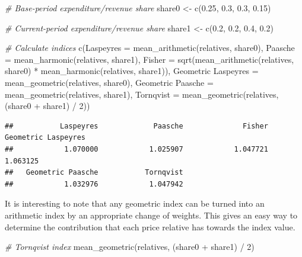 \documentclass[
]{article}
\newenvironment{Shaded}{\begin{snugshade}}{\end{snugshade}}
\newcommand{\AttributeTok}[1]{\textcolor[rgb]{0.77,0.63,0.00}{#1}}
\newcommand{\CommentTok}[1]{\textcolor[rgb]{0.56,0.35,0.01}{\textit{#1}}}
\newcommand{\DecValTok}[1]{\textcolor[rgb]{0.00,0.00,0.81}{#1}}
\newcommand{\FloatTok}[1]{\textcolor[rgb]{0.00,0.00,0.81}{#1}}
\newcommand{\FunctionTok}[1]{\textcolor[rgb]{0.00,0.00,0.00}{#1}}
\newcommand{\NormalTok}[1]{#1}
\newcommand{\OtherTok}[1]{\textcolor[rgb]{0.56,0.35,0.01}{#1}}
\newcommand{\SpecialCharTok}[1]{\textcolor[rgb]{0.00,0.00,0.00}{#1}}
\newcommand{\StringTok}[1]{\textcolor[rgb]{0.31,0.60,0.02}{#1}}
\begin{document}
\begin{Shaded}
\begin{Highlighting}[]
\CommentTok{\# Base{-}period expenditure/revenue share}
\NormalTok{share0 }\OtherTok{\textless{}{-}} \FunctionTok{c}\NormalTok{(}\FloatTok{0.25}\NormalTok{, }\FloatTok{0.3}\NormalTok{, }\FloatTok{0.3}\NormalTok{, }\FloatTok{0.15}\NormalTok{) }

\CommentTok{\# Current{-}period expenditure/revenue share}
\NormalTok{share1 }\OtherTok{\textless{}{-}} \FunctionTok{c}\NormalTok{(}\FloatTok{0.2}\NormalTok{, }\FloatTok{0.2}\NormalTok{, }\FloatTok{0.4}\NormalTok{, }\FloatTok{0.2}\NormalTok{)}

\CommentTok{\# Calculate indices}
\FunctionTok{c}\NormalTok{(}\AttributeTok{Laspeyres =} \FunctionTok{mean\_arithmetic}\NormalTok{(relatives, share0),}
  \AttributeTok{Paasche =} \FunctionTok{mean\_harmonic}\NormalTok{(relatives, share1),}
  \AttributeTok{Fisher =} \FunctionTok{sqrt}\NormalTok{(}\FunctionTok{mean\_arithmetic}\NormalTok{(relatives, share0) }\SpecialCharTok{*}
                  \FunctionTok{mean\_harmonic}\NormalTok{(relatives, share1)),}
  \StringTok{\textasciigrave{}}\AttributeTok{Geometric Laspeyres}\StringTok{\textasciigrave{}} \OtherTok{=} \FunctionTok{mean\_geometric}\NormalTok{(relatives, share0),}
  \StringTok{\textasciigrave{}}\AttributeTok{Geometric Paasche}\StringTok{\textasciigrave{}} \OtherTok{=} \FunctionTok{mean\_geometric}\NormalTok{(relatives, share1),}
  \AttributeTok{Tornqvist =} \FunctionTok{mean\_geometric}\NormalTok{(relatives, (share0 }\SpecialCharTok{+}\NormalTok{ share1) }\SpecialCharTok{/} \DecValTok{2}\NormalTok{))}
\end{Highlighting}
\end{Shaded}

\begin{verbatim}
##           Laspeyres             Paasche              Fisher Geometric Laspeyres 
##            1.070000            1.025907            1.047721            1.063125 
##   Geometric Paasche           Tornqvist 
##            1.032976            1.047942
\end{verbatim}

It is interesting to note that any geometric index can be turned into an arithmetic index by an appropriate change of weights. This gives an easy way to determine the contribution that each price relative has towards the index value.

\begin{Shaded}
\begin{Highlighting}[]
\CommentTok{\# Tornqvist index}
\FunctionTok{mean\_geometric}\NormalTok{(relatives, (share0 }\SpecialCharTok{+}\NormalTok{ share1) }\SpecialCharTok{/} \DecValTok{2}\NormalTok{) }
\end{Highlighting}
\end{Shaded}
\end{document}
